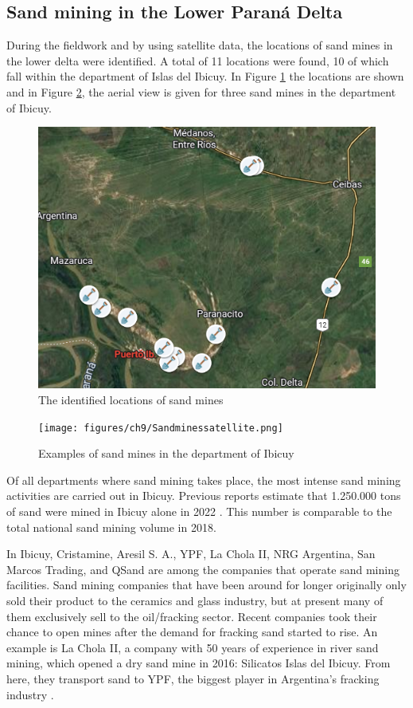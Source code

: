 \subsection{Sand mining in the Lower Paraná Delta}
During the fieldwork and by using satellite data, the locations of sand mines in the lower delta were identified. A total of 11 locations were found, 10 of which fall within the department of Islas del Ibicuy. In Figure \ref{fig:sandminemap} the locations are shown and in Figure \ref{fig:sandminessatellite}, the aerial view is given for three sand mines in the department of Ibicuy.

\begin{figure}[H]
    \centering
    \includegraphics[width=0.6\linewidth]{figures/ch9/SandMap.png}
    \caption{The identified locations of sand mines \autocite{googleGoogleEarth2025}}
    \label{fig:sandminemap}
\end{figure}

\begin{figure}[H]
    \centering
    \texttt{[image: figures/ch9/Sandminessatellite.png]}
    \caption{Examples of sand mines in the department of Ibicuy \autocite{googleGoogleEarth2025}}
    \label{fig:sandminessatellite}
\end{figure}

Of all departments where sand mining takes place, the most intense sand mining activities are carried out in Ibicuy. Previous reports estimate that 1.250.000 tons of sand were mined in Ibicuy alone in 2022 \autocite{fogliaSedArena2023}. This number is comparable to the total national sand mining volume in 2018.

In Ibicuy, Cristamine, Aresil S. A., YPF, La Chola II, NRG Argentina, San Marcos Trading, and QSand are among the companies that operate sand mining facilities. Sand mining companies that have been around for longer originally only sold their product to the ceramics and glass industry, but at present many of them exclusively sell to the oil/fracking sector. Recent companies took their chance to open mines after the demand for fracking sand started to rise. An example is La Chola II, a company with 50 years of experience in river sand mining, which opened a dry sand mine in 2016: Silicatos Islas del Ibicuy. From here, they transport sand to YPF, the biggest player in Argentina's fracking industry \autocite{fogliaSedArena2023}.

